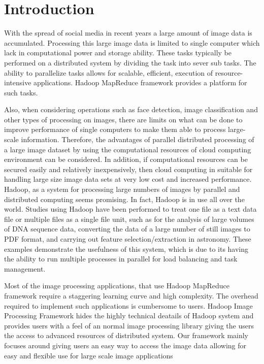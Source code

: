 \documentclass[conference]{IEEEtran}
\begin{document}
	\section{Introduction}
	With the spread of social media in recent years a large amount of image data is accumulated. Processing this large image data is limited to single computer which lack in computational power and storage ability. These tasks typically be performed on a distributed system by dividing the task into sever sub tasks. The ability to parallelize tasks allows for scalable, efficient, execution of resource-intensive applications. Hadoop MapReduce framework provides a platform for such tasks.
	
	Also, when considering operations such as face detection, image classification\cite{Li2009} and other types of processing on images, there are limits on what can be done to improve performance of single computers to make them able to process large-scale information. Therefore, the advantages of parallel distributed processing of a large image dataset by using the computational resources of cloud computing environment can be considered. In addition, if computational resources can be secured easily and relatively inexpensively, then cloud computing in suitable for handling large size image data sets at very low cost and increased performance. Hadoop, as a system for processing large numbers of images by parallel and distributed computing seems promising. In fact, Hadoop is in use all over the world. Studies using Hadoop have been performed to treat one file as a text data file or multiple files as a single file unit, such as for the analysis of large volumes of DNA sequence data, converting the data of a large number of still images to PDF format, and carrying out feature selection/extraction in astronomy. These examples demonstrate the usefulness of this system, which is due to its having the ability to run multiple processes in parallel for load balancing and task management.
	
	Most of the image processing applications, that use Hadoop MapReduce framework require a staggering learning curve and high complexity. The overhead required to implement such applications is cumbersome to users. Hadoop Image Processing Framework hides the highly technical deatails of Hadoop system and provides users with a feel of an normal image processing library giving the users the access to advanced resources of distributed system. Our framework mainly focuses around giving users an easy way to access the image data allowing for easy and flexible use for large scale image applications
	
\end{document}
